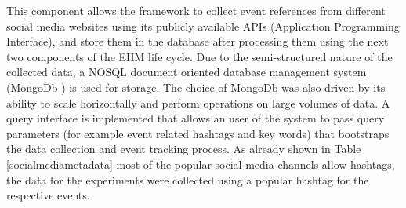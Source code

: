 This component allows the framework to collect event references from different social media websites using its publicly available APIs (Application Programming Interface), and store them in the database after processing them using the next two components of the EIIM life cycle. Due to the semi-structured nature of the collected data, a NOSQL document oriented database management system (MongoDb ) is used for storage. The choice of MongoDb was also driven by its ability to scale horizontally and perform operations on large volumes of data. A query interface is implemented that allows an user of the system to pass query parameters (for example event related hashtags and key words) that bootstraps the data collection and event tracking process. As already shown in Table \ref{socialmediametadata} most of the popular social media channels allow hashtags, the data for the experiments were collected using a popular hashtag for the respective events. 




